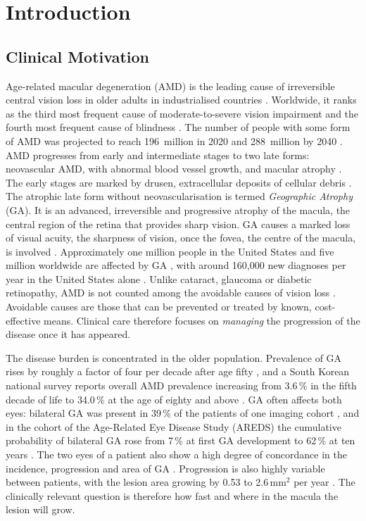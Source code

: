 \cleardoubleoddpage%
\chapter{Introduction}
\label{ch:introduction}


\section{Clinical Motivation}
\label{sec:introduction:motivation}

Age-related macular degeneration (AMD) is the leading cause of irreversible
central vision loss in older adults in industrialised countries \citep{Boopathiraj2024}. Worldwide,
it ranks as the third most frequent cause of moderate-to-severe vision
impairment and the fourth most frequent cause of blindness
\citep{Flaxman2020}. The number of people with some form of AMD was projected
to reach 196~million in 2020 and 288~million by 2040
\citep{Wong2014}. AMD progresses from early and intermediate stages to
two late forms: neovascular AMD, with abnormal blood vessel growth, and
macular atrophy \citep{Vogl2021}. The early stages are marked by drusen,
extracellular deposits of cellular debris \citep{Boyer2017}. The atrophic
late form without neovascularisation is termed \emph{Geographic Atrophy}
(GA). It is an advanced, irreversible and progressive atrophy of the
macula, the central region of the retina that provides sharp vision. GA
causes a marked loss of visual acuity, the sharpness of vision, once the
fovea, the centre of the
macula, is involved \citep{Vallino2024}. Approximately one million
people in the United States and five million worldwide are affected by GA
\citep{Singh2025}, with around 160{,}000 new diagnoses per year in the United
States alone \citep{Vallino2024}. Unlike cataract, glaucoma or diabetic
retinopathy, AMD is not counted among the avoidable causes of vision loss
\citep{Flaxman2020}. Avoidable causes are those that can be prevented or
treated by known, cost-effective means. Clinical care therefore focuses on \emph{managing} the
progression of the disease once it has appeared.

The disease burden is concentrated in the older population. Prevalence of GA
rises by roughly a factor of four per decade after age fifty
\citep{Singh2025}, and a South Korean national survey reports overall AMD
prevalence increasing from 3.6\,\% in the fifth decade of life to 34.0\,\%
at the age of eighty and above \citep{Song2025}. GA often affects both eyes:
bilateral GA was present in 39\,\% of the patients of one imaging cohort
\citep{Yehoshua2011}, and in the cohort of the Age-Related Eye Disease
Study (AREDS) the cumulative probability of
bilateral GA rose from 7\,\% at first GA development to 62\,\% at ten years
\citep{Boyer2017}. The two eyes of a patient also show a high degree of
concordance in the incidence, progression and area of GA
\citep{Boyer2017}. Progression is also highly variable between patients,
with the lesion area growing by 0.53 to 2.6\,mm$^2$ per year
\citep{Mai2024}. The clinically relevant question is therefore how fast
and where in the macula the lesion will grow.

